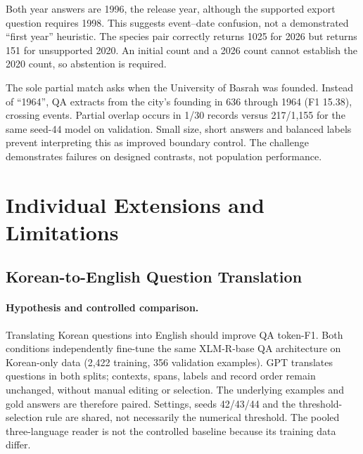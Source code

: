 \documentclass[11pt]{article}
\begin{document}
Both year answers are 1996, the release year, although the supported export question requires 1998. This suggests event--date confusion, not a demonstrated ``first year'' heuristic. The species pair correctly returns 1025 for 2026 but returns 151 for unsupported 2020. An initial count and a 2026 count cannot establish the 2020 count, so abstention is required.

The sole partial match asks when the University of Basrah was founded. Instead of ``1964'', QA extracts from the city's founding in 636 through 1964 (F1 15.38), crossing events. Partial overlap occurs in 1/30 records versus 217/1,155 for the same seed-44 model on validation. Small size, short answers and balanced labels prevent interpreting this as improved boundary control. The challenge demonstrates failures on designed contrasts, not population performance.

\section{Individual Extensions and Limitations}
\subsection{Korean-to-English Question Translation}
\paragraph{Hypothesis and controlled comparison.}
Translating Korean questions into English should improve QA token-F1. Both conditions independently fine-tune the same XLM-R-base QA architecture on Korean-only data (2,422 training, 356 validation examples). GPT translates questions in both splits; contexts, spans, labels and record order remain unchanged, without manual editing or selection. The underlying examples and gold answers are therefore paired. Settings, seeds 42/43/44 and the threshold-selection rule are shared, not necessarily the numerical threshold. The pooled three-language reader is not the controlled baseline because its training data differ.
\end{document}

